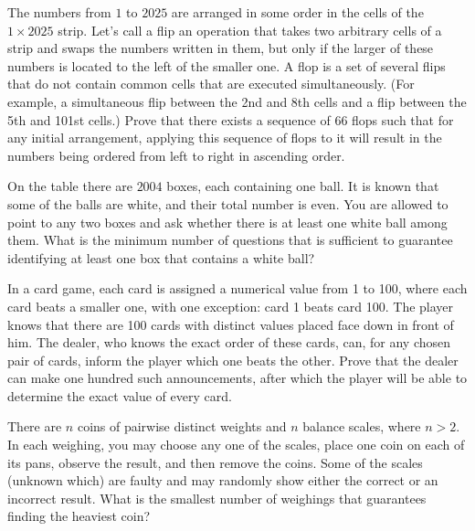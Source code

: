 \begin{problem} [239 olympiad 2025]
    The numbers from $1$ to $2025$ are arranged in some order in the cells of the $1 \times 2025$ strip. Let's call a flip an operation that takes two arbitrary cells of a strip and swaps the numbers written in them, but only if the larger of these numbers is located to the left of the smaller one. A flop is a set of several flips that do not contain common cells that are executed simultaneously. (For example, a simultaneous flip between the 2nd and 8th cells and a flip between the 5th and 101st cells.) Prove that there exists a sequence of $66$ flops such that for any initial arrangement, applying this sequence of flops to it will result in the numbers being ordered from left to right in ascending order.
\end{problem}

\begin{problem} [Russia 2004]
On the table there are $2004$ boxes, each containing one ball. It is known that some of the balls are white, and their total number is even. You are allowed to point to any two boxes and ask whether there is at least one white ball among them. What is the minimum number of questions that is sufficient to guarantee identifying at least one box that contains a white ball?
\end{problem}

\begin{problem}[Russia 2018]
In a card game, each card is assigned a numerical value from 1 to 100, 
where each card beats a smaller one, with one exception: card 1 beats card 100. The player knows that there are 100 cards with distinct values placed face down in front of him. The dealer, who knows the exact order of these cards, can, for any chosen pair of cards, inform the player which one beats the other. 
Prove that the dealer can make one hundred such announcements, after which 
the player will be able to determine the exact value of every card.
\end{problem}

\begin{problem}[Russia 2019]
There are $n$ coins of pairwise distinct weights and $n$ balance scales, where $n > 2$. 
In each weighing, you may choose any one of the scales, place one coin on each of its pans, 
observe the result, and then remove the coins. Some of the scales (unknown which) are faulty 
and may randomly show either the correct or an incorrect result. 
What is the smallest number of weighings that guarantees finding the heaviest coin?
\end{problem}
